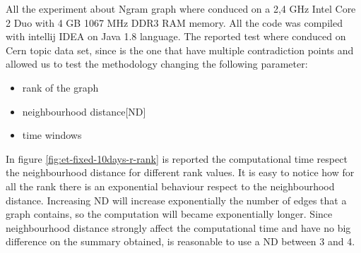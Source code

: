 





All the experiment about Ngram graph where conduced on a 2,4 GHz Intel Core 2 Duo with 4 GB 1067 MHz DDR3 RAM memory.
 All the code was compiled with intellij IDEA on Java 1.8 language. 
The reported test where conduced on Cern topic data set, since is the one that have multiple contradiction points and allowed us to test the methodology changing the following parameter:
\begin{itemize}
	\item rank of the graph
	\item neighbourhood distance[ND]
	\item time windows
\end{itemize}

In figure \ref{fig:et-fixed-10days-r-rank} is reported the computational time respect the neighbourhood distance for different rank values. 
It is easy to notice how for all the rank there is an exponential behaviour respect to the neighbourhood distance. 
Increasing ND will increase exponentially the number of edges that a graph contains, so the computation will became exponentially longer.
Since neighbourhood distance strongly affect the computational time and have no big difference on the summary obtained, is reasonable to use a ND between 3 and 4.

